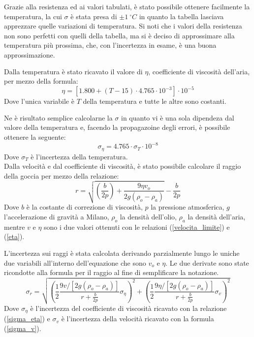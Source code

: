 \documentclass{article}
\begin{document}
Grazie alla resistenza ed ai valori tabulati, è stato possibile ottenere facilmente la temperatura, la cui $\sigma$ è stata presa di $\pm1\ ^\circ C$ in quanto la tabella lasciava apprezzare quelle variazioni di temperatura. Si noti che i valori della resistenza non sono perfetti con quelli della tabella, ma si è deciso di approssimare alla temperatura più prossima, che, con l'incertezza in esame, è una buona approssimazione.

Dalla temperatura è stato ricavato il valore di $\eta$, coefficiente di viscosità dell'aria, per mezzo della formula:
\begin{equation}
	\eta=[1.800+(T-15)\cdot 4.765\cdot 10^{-3}]\cdot 10^{-5}
	\label{eta}
\end{equation}
Dove l'unica variabile è $T$ della temperatura e tutte le altre sono costanti.

Ne è risultato semplice calcolarne la $\sigma$ in quanto vi è una sola dipendeza dal valore della temperatura e, facendo la propagazoine degli errori, è possibile ottenere la seguente:
\begin{equation}
	\sigma_{\eta}=4.765\cdot\sigma_T\cdot 10^{-8}
	\label{sigma_eta}
\end{equation}
Dove $\sigma_T$ è l'incertezza della temperatura.\\

Dalla velocità e dal coefficiente di viscosità, è stato possibile calcolare il raggio della goccia per mezzo della relazione:
\begin{equation}
	r=\sqrt{\left(\frac{b}{2p}\right)+\frac{9\eta v_o}{2g(\rho_o-\rho_a)}}-\frac b{2p}
	\label{raggio}
\end{equation}
Dove $b$ è la costante di correzione di viscosità, $p$ la pressione atmosferica, $g$ l'accelerazione di gravità a Milano, $\rho_o$ la densità dell'olio, $\rho_a$ la densità dell'aria, mentre $v$ e $\eta$ sono i due valori ottenuti con le relazioni (\ref{velocita_limite}) e (\ref{eta}).

L'incertezza sui raggi è stata calcolata derivando parzialmente lungo le uniche due variabili all'interno dell'equazione che sono $v_o$ e $\eta$. Le due derivate sono state ricondotte alla formula per il raggio al fine di semplificare la notazione.
\begin{equation}
	\sigma_r=\sqrt{\left(\frac12\frac{9v/[2g(\rho_o-\rho_a)]}{r+\frac b{2p}}\sigma_{\eta}\right)^2+\left(\frac12\frac{9\eta/[2g(\rho_o-\rho_a)]}{r+\frac b{2p}}\sigma_v\right)^2}
\end{equation}
Dove $\sigma_{\eta}$ è l'incertezza del coefficiente di viscosità ricavato con la relazione (\ref{sigma_eta}) e $\sigma_v$ è l'incertezza della velocità ricavato con la formula (\ref{sigma_v}).\\
\end{document}
